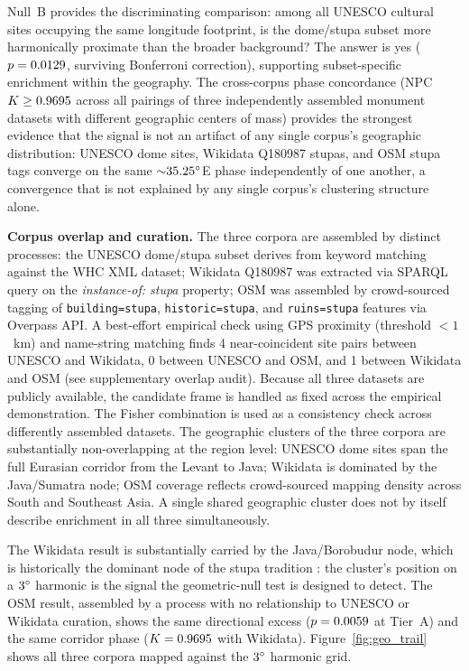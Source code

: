 \documentclass[12pt,a4paper]{article}
\newcommand{\degr}{\ifmmode^\circ\else\textdegree{}\fi}
\begin{document}
Null~B provides the discriminating comparison: among all UNESCO cultural sites
occupying the same longitude footprint, is the dome/stupa subset more
harmonically proximate than the broader background? The answer is yes
($p = 0.0129{}$, surviving Bonferroni correction),
supporting subset-specific enrichment within the geography. The cross-corpus
phase concordance (NPC $K \geq 0.9695{}$ across all pairings of
three independently assembled monument datasets with different
geographic centers of mass) provides the strongest evidence that the
signal is not an artifact of any single corpus's geographic
distribution: UNESCO dome sites, Wikidata Q180987 stupas, and OSM
stupa tags converge on the same ${\sim}35.25\degr$E phase independently
of one another, a convergence that is not explained by any single
corpus's clustering structure alone.

\textbf{Corpus overlap and curation.}
The three corpora are assembled by distinct processes: the UNESCO
dome/stupa subset derives from keyword matching against the WHC XML
dataset; Wikidata Q180987 was extracted via SPARQL query on the
\textit{instance-of: stupa} property; OSM was assembled by
crowd-sourced tagging of \texttt{building=stupa},
\texttt{historic=stupa}, and \texttt{ruins=stupa} features via
Overpass API. A best-effort empirical check using GPS proximity
(threshold $< 1$~km) and name-string matching finds 4 near-coincident
site pairs between UNESCO and Wikidata, 0 between UNESCO and OSM, and
1 between Wikidata and OSM (see supplementary overlap audit). Because
all three datasets are publicly available, the candidate frame is
handled as fixed across the empirical demonstration. The Fisher
combination is used as a consistency check across differently assembled
datasets. The geographic clusters of the three corpora are
substantially non-overlapping at the region
level: UNESCO dome sites span the full Eurasian corridor from the
Levant to Java; Wikidata is dominated by the Java/Sumatra node; OSM
coverage reflects crowd-sourced mapping density across South and
Southeast Asia. A single shared geographic cluster does not by itself
describe enrichment in all three simultaneously.

The Wikidata result is substantially carried by the Java/Borobudur
node, which is historically the dominant node of the stupa tradition
\citep{miksic1990borobudur}: the cluster's position on a $3\degr$
harmonic is the signal the geometric-null test is designed to detect.
The OSM result, assembled by a process with no relationship to UNESCO
or Wikidata curation, shows the same directional excess
($p = 0.0059{}$ at Tier~A) and the same corridor phase
($K = 0.9695{}$ with Wikidata). Figure~\ref{fig:geo_trail}
shows all three corpora mapped against the $3\degr$ harmonic grid.
\end{document}
